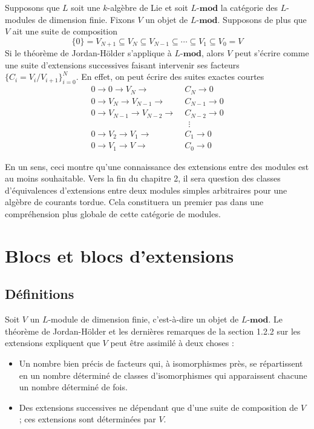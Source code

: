 Supposons que $L$ soit une $k$-algèbre de Lie et soit $L$-$\mathbf{mod}$ la catégorie des $L$-modules de dimension finie. Fixons $V$ un objet de $L$-$\mathbf{mod}$. Supposons de plus que $V$ ait une suite de composition
$$ \{0\} = V_{N+1} \subseteq V_N \subseteq V_{N-1} \subseteq \cdots \subseteq V_1 \subseteq V_0 = V $$
Si le théorème de Jordan-Hölder s'applique à $L$-$\mathbf{mod}$, alors $V$ peut s'écrire comme une suite d'extensions successives faisant intervenir ses facteurs $\{C_i = V_i/V_{i+1}\}_{i=0}^N$. En effet, on peut écrire des suites exactes courtes
\begin{align*}
0 \rightarrow 0 \rightarrow V_N \rightarrow \; &C_N \rightarrow 0\\
0 \rightarrow V_N \rightarrow V_{N-1} \rightarrow \; &C_{N-1} \rightarrow 0\\
0 \rightarrow V_{N-1} \rightarrow V_{N-2} \rightarrow \; &C_{N-2} \rightarrow 0\\
&\;\,\vdots\\
0 \rightarrow V_{2} \rightarrow V_{1} \rightarrow \; &C_1 \rightarrow 0\\
0 \rightarrow V_1 \rightarrow V \rightarrow \; &C_0 \rightarrow 0
\end{align*}

En un sens, ceci montre qu'une connaissance des extensions entre des modules est au moins souhaitable. Vers la fin du chapitre 2, il sera question des classes d'équivalences d'extensions entre deux modules simples arbitraires pour une algèbre de courants tordue. Cela constituera un premier pas dans une compréhension plus globale de cette catégorie de modules.




\section{Blocs et blocs d'extensions}
%
\subsection{Définitions}
Soit $V$ un $L$-module de dimension finie, c'est-à-dire un objet de $L$-$\mathbf{mod}$. Le théorème de Jordan-Hölder et les dernières remarques de la section 1.2.2 sur les extensions expliquent que $V$ peut être assimilé à deux choses :
\begin{itemize}
\item[\textbullet] Un nombre bien précis de facteurs qui, à isomorphismes près, se répartissent en un nombre déterminé de classes d'isomorphismes qui apparaissent chacune un nombre déterminé de fois.
\item[\textbullet] Des extensions successives ne dépendant que d'une suite de composition de $V$ ; ces extensions sont déterminées par $V$.
\end{itemize}


